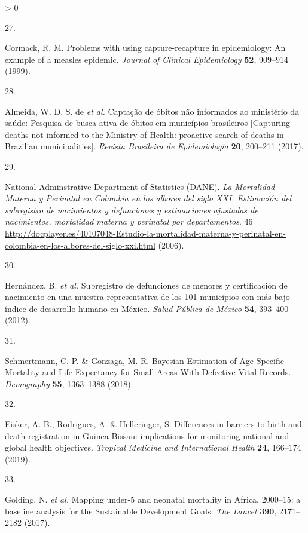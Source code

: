 \documentclass[
]{article}
\newlength{\cslhangindent}
\newlength{\csllabelwidth}
\newenvironment{CSLReferences}[2] %
 {%
  \setlength{\parindent}{0pt}
  \ifodd #1 \everypar{\setlength{\hangindent}{\cslhangindent}}\ignorespaces\fi
  \ifnum #2 > 0
  \setlength{\parskip}{#2\baselineskip}
  \fi
 }%
 {}
\newcommand{\CSLLeftMargin}[1]{\parbox[t]{\csllabelwidth}{#1}}
\newcommand{\CSLRightInline}[1]{\parbox[t]{\linewidth - \csllabelwidth}{#1}\break}
\begin{document}
\begin{CSLReferences}{0}{0}
\leavevmode\hypertarget{ref-Cormack1999}{}%
\CSLLeftMargin{27. }
\CSLRightInline{Cormack, R. M. {Problems with using capture-recapture in epidemiology: An example of a measles epidemic}. \emph{Journal of Clinical Epidemiology} \textbf{52}, 909--914 (1999).}

\leavevmode\hypertarget{ref-DeAlmeida2017a}{}%
\CSLLeftMargin{28. }
\CSLRightInline{Almeida, W. D. S. de \emph{et al.} {Capta{ç}{ã}o de {ó}bitos n{ã}o informados ao minist{é}rio da sa{ú}de: Pesquisa de busca ativa de {ó}bitos em munic{í}pios brasileiros {[}Capturing deaths not informed to the Ministry of Health: proactive search of deaths in Brazilian municipalities{]}}. \emph{Revista Brasileira de Epidemiologia} \textbf{20}, 200--211 (2017).}

\leavevmode\hypertarget{ref-NationalAdminstrativeDepartmentofStatisticsDANE2006}{}%
\CSLLeftMargin{29. }
\CSLRightInline{National Adminstrative Department of Statistics (DANE). \emph{{La Mortalidad Materna y Perinatal en Colombia en los albores del siglo XXI. Estimaci{ó}n del subregistro de nacimientos y defunciones y estimaciones ajustadas de nacimientos, mortalidad materna y perinatal por departamentos}}. 46 \url{http://docplayer.es/40107048-Estudio-la-mortalidad-materna-y-perinatal-en-colombia-en-los-albores-del-siglo-xxi.html} (2006).}

\leavevmode\hypertarget{ref-Hernandez2012}{}%
\CSLLeftMargin{30. }
\CSLRightInline{Hernández, B. \emph{et al.} {Subregistro de defunciones de menores y certificaci{ó}n de nacimiento en una muestra representativa de los 101 municipios con m{á}s bajo {í}ndice de desarrollo humano en M{é}xico}. \emph{Salud P{ú}blica de M{é}xico} \textbf{54}, 393--400 (2012).}

\leavevmode\hypertarget{ref-Schmertmann2018a}{}%
\CSLLeftMargin{31. }
\CSLRightInline{Schmertmann, C. P. \& Gonzaga, M. R. {Bayesian Estimation of Age-Specific Mortality and Life Expectancy for Small Areas With Defective Vital Records}. \emph{Demography} \textbf{55}, 1363--1388 (2018).}

\leavevmode\hypertarget{ref-Fisker2019}{}%
\CSLLeftMargin{32. }
\CSLRightInline{Fisker, A. B., Rodrigues, A. \& Helleringer, S. {Differences in barriers to birth and death registration in Guinea-Bissau: implications for monitoring national and global health objectives}. \emph{Tropical Medicine and International Health} \textbf{24}, 166--174 (2019).}

\leavevmode\hypertarget{ref-Golding2017}{}%
\CSLLeftMargin{33. }
\CSLRightInline{Golding, N. \emph{et al.} {Mapping under-5 and neonatal mortality in Africa, 2000--15: a baseline analysis for the Sustainable Development Goals}. \emph{The Lancet} \textbf{390}, 2171--2182 (2017).}


\end{CSLReferences}
\end{document}
